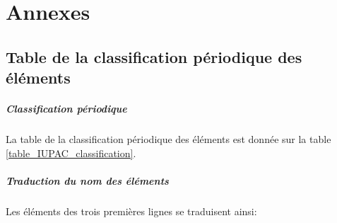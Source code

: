 \chapter{Annexes}
\section{Table de la classification périodique des éléments}
\paragraph{Classification périodique} La table de la classification périodique des éléments est donnée sur la table \ref{table_IUPAC_classification}.
\paragraph{Traduction du nom des éléments} Les éléments des trois premières lignes se traduisent ainsi:

